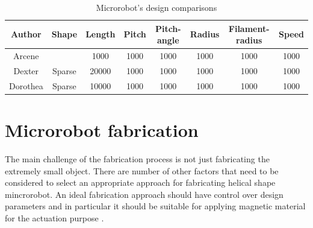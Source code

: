 \documentclass[12pt,a4paper,titlepage]{report}
\newcommand{\head}[1]{\textnormal{\textbf{#1}}}
\begin{document}

















\begin{table}[!ht]

\centering%
{
\begin{tabular}{c c c c c c c c}%
\toprule[2.0pt]



\head{Author} & \head{Shape} & \head{Length} & \head{Pitch} & \head{Pitch-angle} & \head{Radius} & \head{Filament-radius} & \head{Speed}\\

\midrule
Arcene 	& 	    		  & 	1000		& 	1000		& 	1000		& 	1000		& 	1000		& 	1000\\%
Dexter 	& 	Sparse 		  & 	20000	& 	1000		& 	1000		& 	1000		& 	1000		& 	1000\\
Dorothea & 	Sparse 		  & 	10000	& 	1000		& 	1000		& 	1000		& 	1000		& 	1000\\[1ex]%



\bottomrule[2.0pt]
\end{tabular}
}
\label{table:nonlin}%
\caption{Microrobot\rq{}s design comparisons}\label{design}%
\end{table}







\section{Microrobot fabrication} \label{microFabric}

The main challenge of the fabrication process is not just fabricating the extremely small object. 
There are number of other factors that need to be considered to select an appropriate approach for 
fabricating helical shape mincrorobot. An ideal fabrication approach should have control over design 
parameters and in particular it should be suitable for applying magnetic material
 for the actuation purpose \citep{peyer2013bio}.
\end{document}
